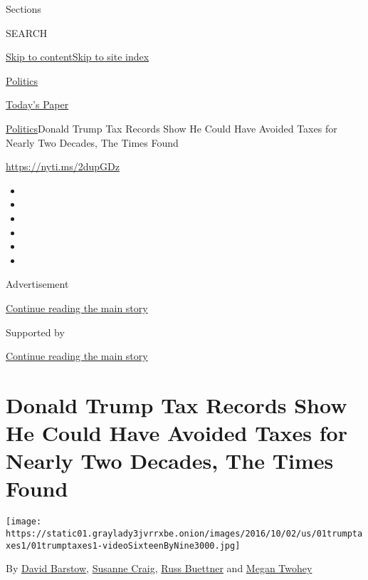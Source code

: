 Sections

SEARCH

\protect\hyperlink{site-content}{Skip to
content}\protect\hyperlink{site-index}{Skip to site index}

\href{https://www.nytimes3xbfgragh.onion/section/politics}{Politics}

\href{https://myaccount.nytimes3xbfgragh.onion/auth/login?response_type=cookie\&client_id=vi}{}

\href{https://www.nytimes3xbfgragh.onion/section/todayspaper}{Today's
Paper}

\href{/section/politics}{Politics}\textbar{}Donald Trump Tax Records
Show He Could Have Avoided Taxes for Nearly Two Decades, The Times Found

\url{https://nyti.ms/2dupGDz}

\begin{itemize}
\item
\item
\item
\item
\item
\item
\end{itemize}

Advertisement

\protect\hyperlink{after-top}{Continue reading the main story}

Supported by

\protect\hyperlink{after-sponsor}{Continue reading the main story}

\hypertarget{donald-trump-tax-records-show-he-could-have-avoided-taxes-for-nearly-two-decades-the-times-found}{%
\section{Donald Trump Tax Records Show He Could Have Avoided Taxes for
Nearly Two Decades, The Times
Found}\label{donald-trump-tax-records-show-he-could-have-avoided-taxes-for-nearly-two-decades-the-times-found}}

\texttt{[image: https://static01.graylady3jvrrxbe.onion/images/2016/10/02/us/01trumptaxes1/01trumptaxes1-videoSixteenByNine3000.jpg]}

By \href{https://www.nytimes3xbfgragh.onion/by/david-barstow}{David
Barstow},
\href{https://www.nytimes3xbfgragh.onion/by/susanne-craig}{Susanne
Craig}, \href{https://www.nytimes3xbfgragh.onion/by/russ-buettner}{Russ
Buettner} and
\href{https://www.nytimes3xbfgragh.onion/by/megan-twohey}{Megan Twohey}

